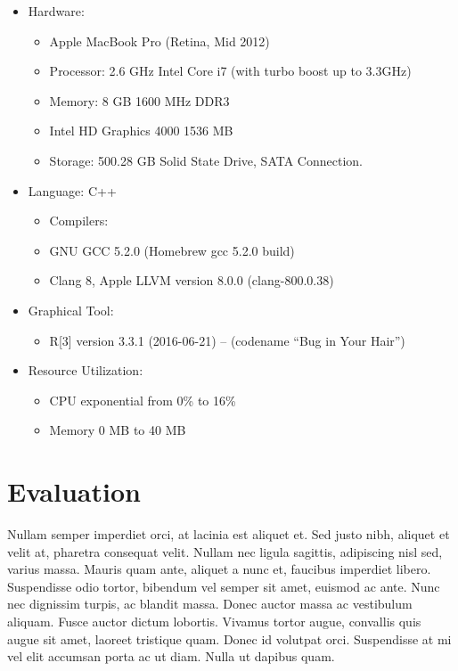 \documentclass[]{elsarticle} %
\providecommand{\tightlist}{%
  \setlength{\itemsep}{0pt}\setlength{\parskip}{0pt}}
\begin{document}
\begin{itemize}
\tightlist
\item
  Hardware:

  \begin{itemize}
  \tightlist
  \item
    Apple MacBook Pro (Retina, Mid 2012)
  \item
    Processor: 2.6 GHz Intel Core i7 (with turbo boost up to 3.3GHz)
  \item
    Memory: 8 GB 1600 MHz DDR3
  \item
    Intel HD Graphics 4000 1536 MB
  \item
    Storage: 500.28 GB Solid State Drive, SATA Connection.
  \end{itemize}
\item
  Language: C++

  \begin{itemize}
  \tightlist
  \item
    Compilers:
  \item
    GNU GCC 5.2.0 (Homebrew gcc 5.2.0 build)
  \item
    Clang 8, Apple LLVM version 8.0.0 (clang-800.0.38)
  \end{itemize}
\item
  Graphical Tool:

  \begin{itemize}
  \tightlist
  \item
    R{[}3{]} version 3.3.1 (2016-06-21) -- (codename ``Bug in Your
    Hair'')
  \end{itemize}
\item
  Resource Utilization:

  \begin{itemize}
  \tightlist
  \item
    CPU exponential from 0\% to 16\%
  \item
    Memory 0 MB to 40 MB
  \end{itemize}
\end{itemize}

\section{Evaluation}\label{evaluation}

Nullam semper imperdiet orci, at lacinia est aliquet et. Sed justo nibh,
aliquet et velit at, pharetra consequat velit. Nullam nec ligula
sagittis, adipiscing nisl sed, varius massa. Mauris quam ante, aliquet a
nunc et, faucibus imperdiet libero. Suspendisse odio tortor, bibendum
vel semper sit amet, euismod ac ante. Nunc nec dignissim turpis, ac
blandit massa. Donec auctor massa ac vestibulum aliquam. Fusce auctor
dictum lobortis. Vivamus tortor augue, convallis quis augue sit amet,
laoreet tristique quam. Donec id volutpat orci. Suspendisse at mi vel
elit accumsan porta ac ut diam. Nulla ut dapibus quam.
\end{document}
